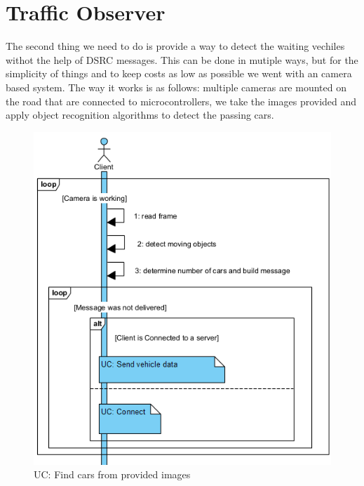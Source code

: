 \documentclass[17pt]{report}
\begin{document}
\pagebreak

\section{Traffic Observer}
\indent \indent
The second thing we need to do is provide a way to detect the
waiting vechiles withot the help of DSRC messages. This can be
done in mutiple ways, but for the simplicity of things and to keep
costs as low as possible we went with an camera based system.
The way it works is as follows: multiple cameras are mounted on the road 
that are connected to microcontrollers, we take the images provided and 
apply object recognition algorithms to detect the passing cars.

\begin{figure}[h!]
    \includegraphics[width=\textwidth]{UC/ProcessImageAndFindTheCars.png}
    \caption{UC: Find cars from provided images}
    \label{fig:UC_FindCars}
\end{figure}
\end{document}
